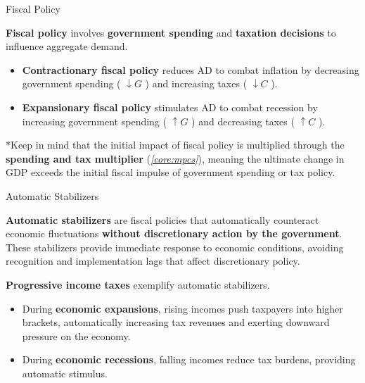 \documentclass[10pt]{article}
\begin{document}
    \begin{core}[label=core:fiscal]{Fiscal Policy}

      \textbf{Fiscal policy} involves \textbf{government spending} and \textbf{taxation decisions} to influence aggregate demand. 

      \begin{itemize}

        \item \textbf{Contractionary fiscal policy} reduces AD to combat inflation by decreasing government spending ( $\downarrow G$ ) and increasing taxes ( $\downarrow C$ ). 

        \item \textbf{Expansionary fiscal policy} stimulates AD to combat recession by increasing government spending ( $\uparrow G$ ) and decreasing taxes ( $\uparrow C$ ).

      \end{itemize}

      *Keep in mind that the initial impact of fiscal policy is multiplied through the \textbf{spending and tax multiplier} (\textit{\autoref{core:mpcs}}), meaning the ultimate change in GDP exceeds the initial fiscal impulse of government spending or tax policy.

    \end{core}

    \begin{core}{Automatic Stabilizers}

      \textbf{Automatic stabilizers} are fiscal policies that automatically counteract economic fluctuations \textbf{without discretionary action by the government}. These stabilizers provide immediate response to economic conditions, avoiding recognition and implementation lags that affect discretionary policy.

      \textbf{Progressive income taxes} exemplify automatic stabilizers.
  
      \begin{itemize}

        \item During \textbf{economic expansions}, rising incomes push taxpayers into higher brackets, automatically increasing tax revenues and exerting downward pressure on the economy.

        \item During \textbf{economic recessions}, falling incomes reduce tax burdens, providing automatic stimulus.

      \end{itemize}

    \end{core}
\end{document}
